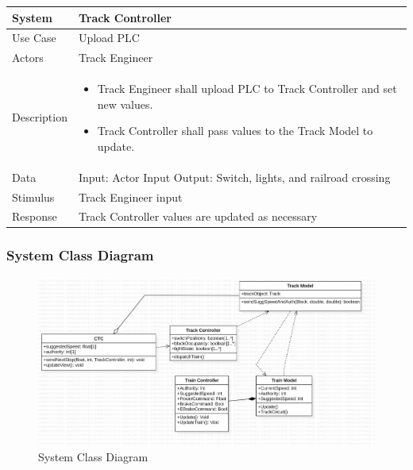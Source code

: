 \documentclass{article}
\begin{document}
    \begin{longtable}{
    || >{\raggedright\arraybackslash}m{}
    | >{\raggedright\arraybackslash}m{}||}
    \hline
    \textbf{System} & \textbf{Track Controller} \\
    \hline
    Use Case & Upload PLC\\
    \hline
    Actors & Track Engineer\\
    \hline
    Description & \begin{itemize}
        \item Track Engineer shall upload PLC to Track Controller and set new values. 
        \item Track Controller shall pass values to the Track Model to update. 
    \end{itemize}\\
    \hline
    Data & Input: Actor Input \newline Output: Switch, lights, and railroad crossing\\
    \hline
    Stimulus & Track Engineer input\\
    \hline
    Response & Track Controller values are updated as necessary\\
    \hline
    \end{longtable}
    
    \subsubsection{System Class Diagram}
    \begin{figure}[H]
        \centering
        \includegraphics[width=\textwidth]{./System/System_Class_Diagram.png}
        \caption{System Class Diagram}
        \label{fig:System Class Diagram}
    \end{figure}
\end{document}
